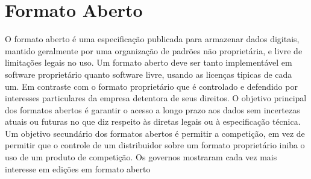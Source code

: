 \section{Formato Aberto}
O formato aberto é uma especificação publicada para armazenar dados digitais, mantido geralmente por uma organização de padrões não proprietária, e livre de limitações legais no uso. Um formato aberto deve ser tanto implementável em software proprietário quanto software livre, usando as licenças tipicas de cada um. Em contraste com o formato proprietário que é controlado e defendido por interesses particulares da empresa detentora de seus direitos. O objetivo principal dos formatos abertos é garantir o acesso a longo prazo aos dados sem incertezas atuais ou futuras no que diz respeito às diretas legais ou à especificação técnica. Um objetivo secundário dos formatos abertos é permitir a competição, em vez de permitir que o controle de um distribuidor sobre um formato proprietário iniba o uso de um produto de competição. Os governos mostraram cada vez mais interesse em edições em formato aberto \cite{Wikipedia 2012}

